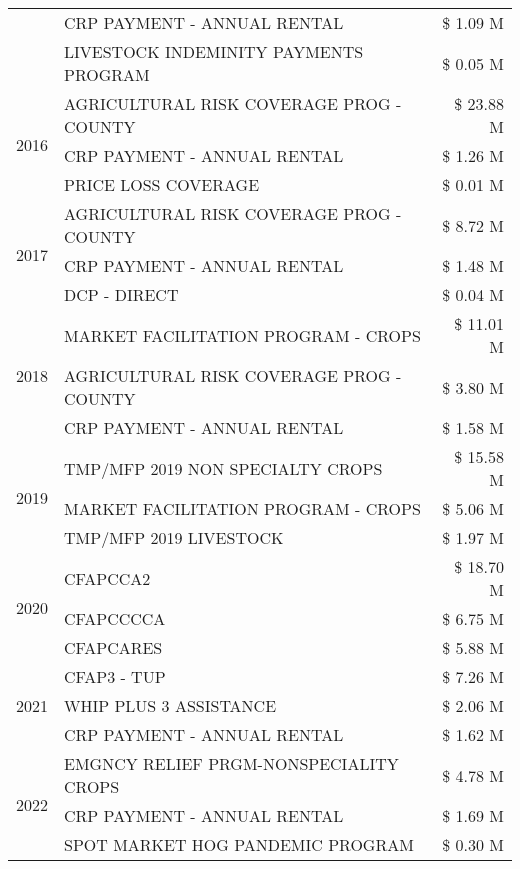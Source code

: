 \begin{tabular}{llr}
 & CRP PAYMENT - ANNUAL RENTAL & \$ 1.09 M \\
 & LIVESTOCK INDEMINITY PAYMENTS PROGRAM & \$ 0.05 M \\
\cline{1-3}
\multirow[t]{3}{*}{2016} & AGRICULTURAL RISK COVERAGE PROG - COUNTY & \$ 23.88 M \\
 & CRP PAYMENT - ANNUAL RENTAL & \$ 1.26 M \\
 & PRICE LOSS COVERAGE & \$ 0.01 M \\
\cline{1-3}
\multirow[t]{3}{*}{2017} & AGRICULTURAL RISK COVERAGE PROG - COUNTY & \$ 8.72 M \\
 & CRP PAYMENT - ANNUAL RENTAL & \$ 1.48 M \\
 & DCP - DIRECT & \$ 0.04 M \\
\cline{1-3}
\multirow[t]{3}{*}{2018} & MARKET FACILITATION PROGRAM - CROPS & \$ 11.01 M \\
 & AGRICULTURAL RISK COVERAGE PROG - COUNTY & \$ 3.80 M \\
 & CRP PAYMENT - ANNUAL RENTAL & \$ 1.58 M \\
\cline{1-3}
\multirow[t]{3}{*}{2019} & TMP/MFP 2019 NON SPECIALTY CROPS & \$ 15.58 M \\
 & MARKET FACILITATION PROGRAM - CROPS & \$ 5.06 M \\
 & TMP/MFP 2019 LIVESTOCK & \$ 1.97 M \\
\cline{1-3}
\multirow[t]{3}{*}{2020} & CFAPCCA2 & \$ 18.70 M \\
 & CFAPCCCCA & \$ 6.75 M \\
 & CFAPCARES & \$ 5.88 M \\
\cline{1-3}
\multirow[t]{3}{*}{2021} & CFAP3 - TUP & \$ 7.26 M \\
 & WHIP PLUS 3 ASSISTANCE & \$ 2.06 M \\
 & CRP PAYMENT - ANNUAL RENTAL & \$ 1.62 M \\
\cline{1-3}
\multirow[t]{3}{*}{2022} & EMGNCY RELIEF PRGM-NONSPECIALITY CROPS & \$ 4.78 M \\
 & CRP PAYMENT - ANNUAL RENTAL & \$ 1.69 M \\
 & SPOT MARKET HOG PANDEMIC PROGRAM & \$ 0.30 M \\
\cline{1-3}
\bottomrule
\end{tabular}
